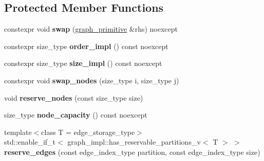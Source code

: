 \subsection*{Protected Member Functions}
\begin{DoxyCompactItemize}
\item 
\mbox{\label{classsequoia_1_1maths_1_1graph__primitive_a5daaf1d4434564d804ad69b9b1c1851e}} 
constexpr void {\bfseries swap} (\mbox{\hyperlink{classsequoia_1_1maths_1_1graph__primitive}{graph\+\_\+primitive}} \&rhs) noexcept
\item 
\mbox{\label{classsequoia_1_1maths_1_1graph__primitive_aba33964900093630c4752b1332b595f0}} 
constexpr size\+\_\+type {\bfseries order\+\_\+impl} () const noexcept
\item 
\mbox{\label{classsequoia_1_1maths_1_1graph__primitive_aa48b9ac010adc543a902c7f0196312e6}} 
constexpr size\+\_\+type {\bfseries size\+\_\+impl} () const noexcept
\item 
\mbox{\label{classsequoia_1_1maths_1_1graph__primitive_a47bacd2540cedc9108116af317276621}} 
constexpr void {\bfseries swap\+\_\+nodes} (size\+\_\+type i, size\+\_\+type j)
\item 
\mbox{\label{classsequoia_1_1maths_1_1graph__primitive_afedce51c52c53b2b01fd9a69b04f885e}} 
void {\bfseries reserve\+\_\+nodes} (const size\+\_\+type size)
\item 
\mbox{\label{classsequoia_1_1maths_1_1graph__primitive_ac2941b24817886d4b7b876c4c7424437}} 
size\+\_\+type {\bfseries node\+\_\+capacity} () const noexcept
\item 
\mbox{\label{classsequoia_1_1maths_1_1graph__primitive_abd8653f95905e6f2045ca7d6de44a535}} 
{\footnotesize template$<$class T  = edge\+\_\+storage\+\_\+type$>$ }\\std\+::enable\+\_\+if\+\_\+t$<$ graph\+\_\+impl\+::has\+\_\+reservable\+\_\+partitions\+\_\+v$<$ T $>$ $>$ {\bfseries reserve\+\_\+edges} (const edge\+\_\+index\+\_\+type partition, const edge\+\_\+index\+\_\+type size)

\end{DoxyCompactItemize}
